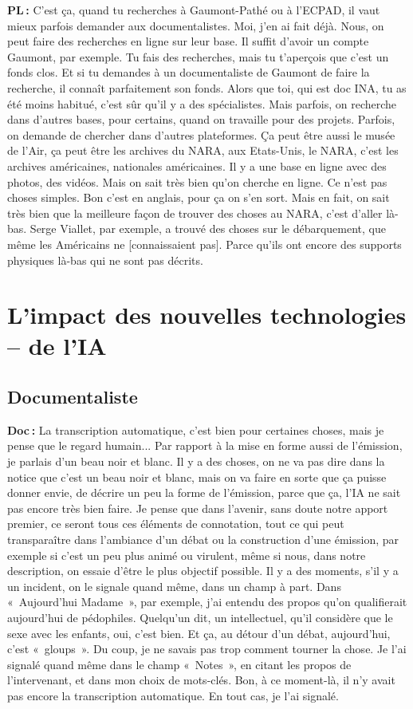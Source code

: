 \textbf{PL :} C'est ça, quand tu recherches à Gaumont-Pathé ou à l'ECPAD, il vaut mieux parfois demander aux documentalistes. Moi, j'en ai fait déjà.  Nous, on peut faire des recherches en ligne sur leur base. Il suffit d'avoir un compte Gaumont, par exemple. Tu fais des recherches, mais tu t'aperçois que c'est un fonds clos. Et si tu demandes à un documentaliste de Gaumont de faire la recherche, il connaît parfaitement son fonds.  Alors que toi, qui est doc INA, tu as été moins habitué, c'est sûr qu'il y a des spécialistes. Mais parfois, on recherche dans d'autres bases, pour certains, quand on travaille pour des projets. Parfois, on demande de chercher dans d'autres plateformes. Ça peut être aussi le musée de l’Air, ça peut être les archives du NARA, aux Etats-Unis, le NARA, c'est les archives américaines, nationales américaines. Il y a une base en ligne avec des photos, des vidéos. Mais on sait très bien qu'on cherche en ligne. Ce n'est pas choses simples. Bon c’est en anglais, pour ça on s'en sort. Mais en fait, on sait très bien que la meilleure façon de trouver des choses au NARA, c'est d'aller là-bas. Serge Viallet, par exemple, a trouvé des choses sur le débarquement, que même les Américains ne [connaissaient pas]. Parce qu'ils ont encore des supports physiques là-bas qui ne sont pas décrits. 

\section*{L’impact des nouvelles technologies – de l’IA}

\subsection*{Documentaliste} 

\textbf{Doc :} La transcription automatique, c'est bien pour certaines choses, mais je pense que le regard humain...  Par rapport à la mise en forme aussi de l'émission, je parlais d'un beau noir et blanc. Il y a des choses, on ne va pas dire dans la notice que c'est un beau noir et blanc, mais on va faire en sorte que ça puisse donner envie, de décrire un peu la forme de l'émission, parce que ça, l'IA ne sait pas encore très bien faire. Je pense que dans l'avenir, sans doute notre apport premier, ce seront tous ces éléments de connotation, tout ce qui peut transparaître dans l'ambiance d'un débat ou la construction d’une émission, par exemple si c'est un peu plus animé ou virulent, même si nous, dans notre description, on essaie d’être le plus objectif possible. Il y a des moments, s'il y a un incident, on le signale quand même, dans un champ à part. Dans « Aujourd'hui Madame », par exemple, j'ai entendu des propos qu'on qualifierait aujourd'hui de pédophiles. Quelqu'un dit, un intellectuel, qu'il considère que le sexe avec les enfants, oui, c'est bien. Et ça, au détour d'un débat, aujourd'hui, c'est « gloups ».  Du coup, je ne savais pas trop comment tourner la chose. Je l'ai signalé quand même dans le champ « Notes », en citant les propos de l’intervenant, et dans mon choix de mots-clés. Bon, à ce moment-là, il n'y avait pas encore la transcription automatique. En tout cas, je l'ai signalé.

